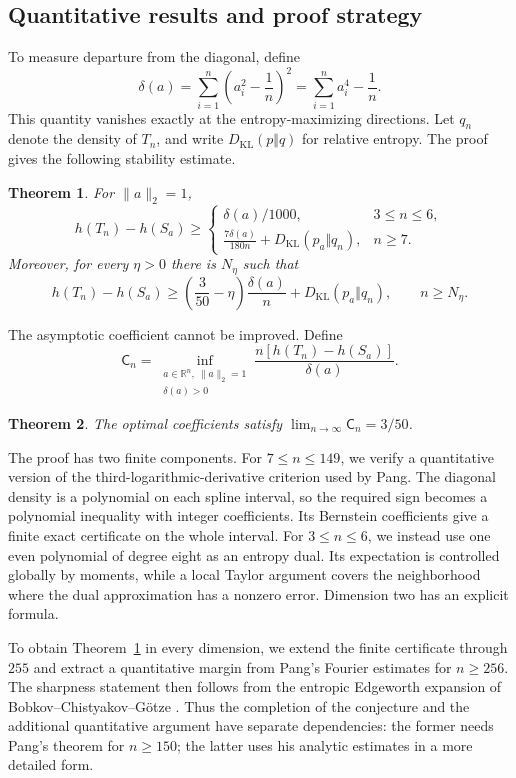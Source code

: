 \documentclass[11pt,a4paper]{article}
\newtheorem{theorem}{Theorem}[section]
\theoremstyle{remark}\newtheorem{remark}[theorem]{Remark}
\newcommand{\KL}{D_{\mathrm{KL}}}
\newcommand{\R}{\mathbb R}
\begin{document}
\subsection{Quantitative results and proof strategy}
To measure departure from the diagonal, define
\[
 \delta(a)=\sum_{i=1}^n\left(a_i^2-\frac1n\right)^2
          =\sum_{i=1}^na_i^4-\frac1n.
\]
This quantity vanishes exactly at the entropy-maximizing directions.
Let $q_n$ denote the density of $T_n$, and write $\KL(p\Vert q)$ for
relative entropy. The proof gives the following stability estimate.

\begin{theorem}\label{thm:stability}
For $\|a\|_2=1$,
\[
 h(T_n)-h(S_a)\ge
 \begin{cases}
 \delta(a)/1000,&3\le n\le6,\\[2pt]
 \displaystyle\frac{7\delta(a)}{180n}+\KL(p_a\Vert q_n),&n\ge7.
 \end{cases}
\]
Moreover, for every $\eta>0$ there is $N_\eta$ such that
\begin{equation}\label{eq:asymptotic-stability}
 h(T_n)-h(S_a)\ge
 \left(\frac3{50}-\eta\right)\frac{\delta(a)}n
 +\KL(p_a\Vert q_n),\qquad n\ge N_\eta.
\end{equation}
\end{theorem}

The asymptotic coefficient cannot be improved. Define
\[
 \mathsf C_n=\inf_{\substack{a\in\R^n,\ \|a\|_2=1\\\delta(a)>0}}
        \frac{n[h(T_n)-h(S_a)]}{\delta(a)}.
\]
\begin{theorem}\label{thm:sharp}
The optimal coefficients satisfy $\displaystyle\lim_{n\to\infty}\mathsf C_n=3/50$.
\end{theorem}

The proof has two finite components. For $7\le n\le149$, we verify a
quantitative version of the third-logarithmic-derivative criterion used
by Pang. The diagonal density is a polynomial on each spline interval,
so the required sign becomes a polynomial inequality with integer
coefficients. Its Bernstein coefficients give a finite exact certificate
on the whole interval. For $3\le n\le6$, we instead use one even
polynomial of degree eight as an entropy dual. Its expectation is
controlled globally by moments, while a local Taylor argument covers
the neighborhood where the dual approximation has a nonzero error.
Dimension two has an explicit formula.

To obtain Theorem~\ref{thm:stability} in every dimension, we extend the
finite certificate through $255$ and extract a quantitative margin from
Pang's Fourier estimates for $n\ge256$. The sharpness statement then
follows from the entropic Edgeworth expansion of
Bobkov--Chistyakov--G\"otze \cite{BCG}. Thus the completion of the
conjecture and the additional quantitative argument have separate
dependencies: the former needs Pang's theorem for $n\ge150$; the latter
uses his analytic estimates in a more detailed form.
\end{document}
